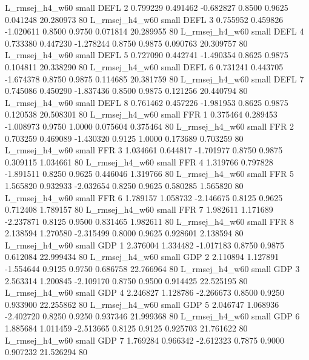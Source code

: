 L_rmsej_h4_w60      small     DEFL                 2 0.799229 0.491462 -0.682827 0.8500 0.9625  0.041248   20.280973 80
L_rmsej_h4_w60      small     DEFL                 3 0.755952 0.459826 -1.020611 0.8500 0.9750  0.071814   20.289955 80
L_rmsej_h4_w60      small     DEFL                 4 0.733380 0.447230 -1.278244 0.8750 0.9875  0.090763   20.309757 80
L_rmsej_h4_w60      small     DEFL                 5 0.727090 0.442741 -1.490354 0.8625 0.9875  0.104811   20.338290 80
L_rmsej_h4_w60      small     DEFL                 6 0.731241 0.443705 -1.674378 0.8750 0.9875  0.114685   20.381759 80
L_rmsej_h4_w60      small     DEFL                 7 0.745086 0.450290 -1.837436 0.8500 0.9875  0.121256   20.440794 80
L_rmsej_h4_w60      small     DEFL                 8 0.761462 0.457226 -1.981953 0.8625 0.9875  0.120538   20.508301 80
L_rmsej_h4_w60      small      FFR                 1 0.375464 0.289453 -1.008973 0.9750 1.0000  0.075604    0.375464 80
L_rmsej_h4_w60      small      FFR                 2 0.703259 0.469089 -1.430320 0.9125 1.0000  0.173689    0.703259 80
L_rmsej_h4_w60      small      FFR                 3 1.034661 0.644817 -1.701977 0.8750 0.9875  0.309115    1.034661 80
L_rmsej_h4_w60      small      FFR                 4 1.319766 0.797828 -1.891511 0.8250 0.9625  0.446046    1.319766 80
L_rmsej_h4_w60      small      FFR                 5 1.565820 0.932933 -2.032654 0.8250 0.9625  0.580285    1.565820 80
L_rmsej_h4_w60      small      FFR                 6 1.789157 1.058732 -2.146675 0.8125 0.9625  0.712408    1.789157 80
L_rmsej_h4_w60      small      FFR                 7 1.982611 1.171689 -2.237871 0.8125 0.9500  0.831465    1.982611 80
L_rmsej_h4_w60      small      FFR                 8 2.138594 1.270580 -2.315499 0.8000 0.9625  0.928601    2.138594 80
L_rmsej_h4_w60      small      GDP                 1 2.376004 1.334482 -1.017183 0.8750 0.9875  0.612084   22.999434 80
L_rmsej_h4_w60      small      GDP                 2 2.110894 1.127891 -1.554644 0.9125 0.9750  0.686758   22.766964 80
L_rmsej_h4_w60      small      GDP                 3 2.563314 1.200845 -2.109170 0.8750 0.9500  0.914425   22.525195 80
L_rmsej_h4_w60      small      GDP                 4 2.246827 1.128786 -2.266673 0.8500 0.9250  0.933900   22.255862 80
L_rmsej_h4_w60      small      GDP                 5 2.046747 1.068936 -2.402720 0.8250 0.9250  0.937346   21.999368 80
L_rmsej_h4_w60      small      GDP                 6 1.885684 1.011459 -2.513665 0.8125 0.9125  0.925703   21.761622 80
L_rmsej_h4_w60      small      GDP                 7 1.769284 0.966342 -2.612323 0.7875 0.9000  0.907232   21.526294 80
